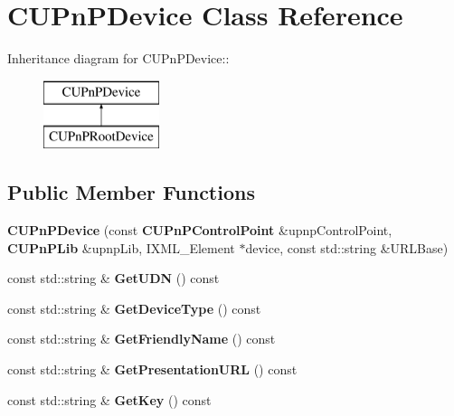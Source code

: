 \section{CUPnPDevice Class Reference}
\label{classCUPnPDevice}
Inheritance diagram for CUPnPDevice::\begin{figure}[H]
\begin{center}
\leavevmode
\includegraphics[height=2cm]{classCUPnPDevice}
\end{center}
\end{figure}
\subsection*{Public Member Functions}
\begin{DoxyCompactItemize}
\item 
{\bfseries CUPnPDevice} (const {\bf CUPnPControlPoint} \&upnpControlPoint, {\bf CUPnPLib} \&upnpLib, IXML\_\-Element $\ast$device, const std::string \&URLBase)\label{classCUPnPDevice_aec4c7675e36b1bdf9c822f2cd8367352}

\item 
const std::string \& {\bfseries GetUDN} () const \label{classCUPnPDevice_af97066876c21ade2398c2b3e8ed431d0}

\item 
const std::string \& {\bfseries GetDeviceType} () const \label{classCUPnPDevice_a2a0452fb483c7360281600f938a49768}

\item 
const std::string \& {\bfseries GetFriendlyName} () const \label{classCUPnPDevice_a4dfb758327bb215dcbec43db2c9a2f39}

\item 
const std::string \& {\bfseries GetPresentationURL} () const \label{classCUPnPDevice_aa2af93a95c8bf17d22c8088377681980}

\item 
const std::string \& {\bfseries GetKey} () const \label{classCUPnPDevice_ad9fccd02183f4cd4bb198a6b184c62b7}

\end{DoxyCompactItemize}
